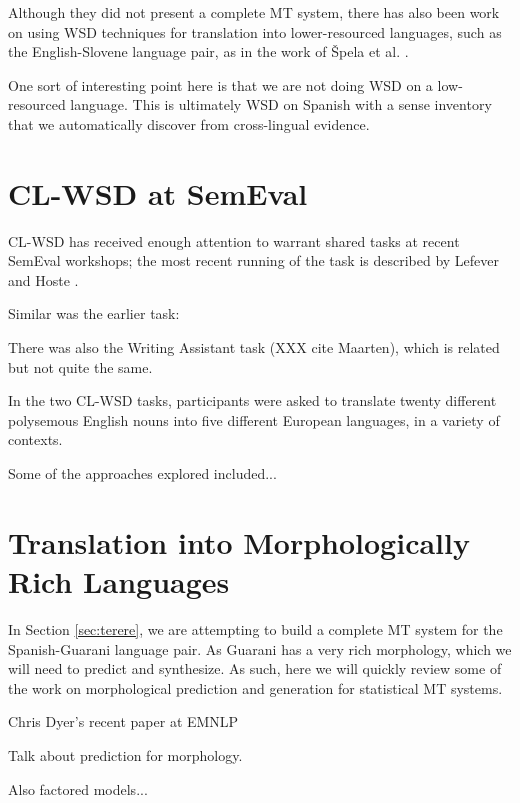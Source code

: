 Although they did not present a complete MT system, there has also been work
on using WSD techniques for translation into lower-resourced languages, such as
the English-Slovene language pair, as in
the work of \v{S}pela et al.
\cite{vintar-fivser-vrvsvcaj:2012:ESIRMT-HyTra2012}. 

One sort of interesting point here is that we are not doing WSD on a
low-resourced language. This is ultimately WSD on Spanish with a sense
inventory that we automatically discover from cross-lingual evidence.


\section{CL-WSD at SemEval}
CL-WSD has received enough attention to warrant shared tasks at recent SemEval
workshops; the most recent running of the task is described by Lefever and
Hoste \cite{task10}.

Similar was the earlier task: \cite{lefever-hoste:2009:SEW}

There was also the Writing Assistant task (XXX cite Maarten), which is related
but not quite the same.

In the two CL-WSD tasks, participants were asked to translate twenty different
polysemous English nouns into five different European languages, in a variety
of contexts.

Some of the approaches explored included...


\section{Translation into Morphologically Rich Languages}
In Section \ref{sec:terere}, we are attempting to build a complete MT system
for the Spanish-Guarani language pair. As Guarani has a very rich morphology,
which we will need to predict and synthesize. As such, here we will quickly
review some of the work on morphological prediction and generation for
statistical MT systems.

Chris Dyer's recent paper at EMNLP
\cite{chahuneau:2013:emnlp}

Talk about prediction for morphology.
\cite{toutanova-suzuki-ruopp:2008:ACLMain}

Also factored models...
\cite{yeniterzi-oflazer:2010:ACL}
